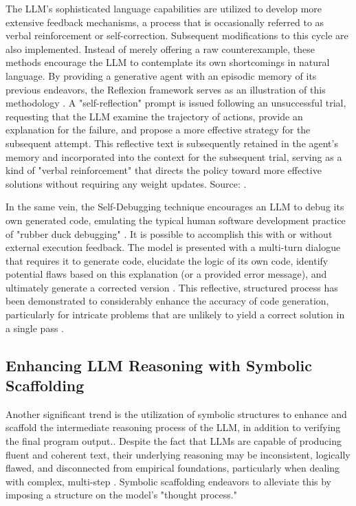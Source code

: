 \documentclass[12pt, a4paper]{report}
\begin{document}
The LLM's sophisticated language capabilities are utilized to develop more extensive feedback mechanisms, a process that is occasionally referred to as verbal reinforcement or self-correction. Subsequent modifications to this cycle are also implemented. Instead of merely offering a raw counterexample, these methods encourage the LLM to contemplate its own shortcomings in natural language. By providing a generative agent with an episodic memory of its previous endeavors, the Reflexion framework serves as an illustration of this methodology \citep{shinn2023reflexion}. A "self-reflection" prompt is issued following an unsuccessful trial, requesting that the LLM examine the trajectory of actions, provide an explanation for the failure, and propose a more effective strategy for the subsequent attempt. This reflective text is subsequently retained in the agent's memory and incorporated into the context for the subsequent trial, serving as a kind of "verbal reinforcement" that directs the policy toward more effective solutions without requiring any weight updates. Source: \citep{tjandrasuwita2021learning}.

In the same vein, the Self-Debugging technique encourages an LLM to debug its own generated code, emulating the typical human software development practice of "rubber duck debugging" \citep{chen2021evaluating}. It is possible to accomplish this with or without external execution feedback. The model is presented with a multi-turn dialogue that requires it to generate code, elucidate the logic of its own code, identify potential flaws based on this explanation (or a provided error message), and ultimately generate a corrected version \citep{pan2023rustassistant}. This reflective, structured process has been demonstrated to considerably enhance the accuracy of code generation, particularly for intricate problems that are unlikely to yield a correct solution in a single pass \citep{mao2019neuro}.

\subsection{Enhancing LLM Reasoning with Symbolic Scaffolding}
Another significant trend is the utilization of symbolic structures to enhance and scaffold the intermediate reasoning process of the LLM, in addition to verifying the final program output.. Despite the fact that LLMs are capable of producing fluent and coherent text, their underlying reasoning may be inconsistent, logically flawed, and disconnected from empirical foundations, particularly when dealing with complex, multi-step \citep{zhang2024proofofthought}. Symbolic scaffolding endeavors to alleviate this by imposing a structure on the model's "thought process."
\end{document}
